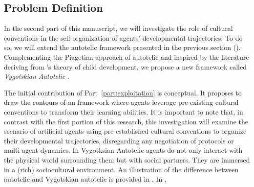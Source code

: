 \subsection{Problem Definition}
\label{sec:problem-def-vygo}

In the second part of this manuscript, we will investigate the role of cultural conventions in the self-organization of agents' developmental trajectories. To do so, we will extend the autotelic \rl framework presented in the previous section (). Complementing the Piagetian approach of autotelic \rl and inspired by the literature deriving from \citet{vygotsky_thought_1934}'s theory of child development, we propose a new framework called \textit{Vygotskian Autotelic \ai}.

The initial contribution of Part~\ref{part:exploitation} is conceptual. It proposes to draw the contours of an \ai framework where agents leverage pre-existing cultural conventions to transform their learning abilities. It is important to note that, in contrast with the first portion of this research, this investigation will examine the scenario of artificial agents using pre-established cultural conventions to organize their developmental trajectories, disregarding any negotiation of protocols or multi-agent dynamics. In Vygotksian Autotelic agents do not only interact with the physical world surrounding them but with social partners. They are immersed in a (rich) sociocultural environment. An illustration of the difference between autotelic \rl and Vygotskian autotelic \rl is provided in . In , 

